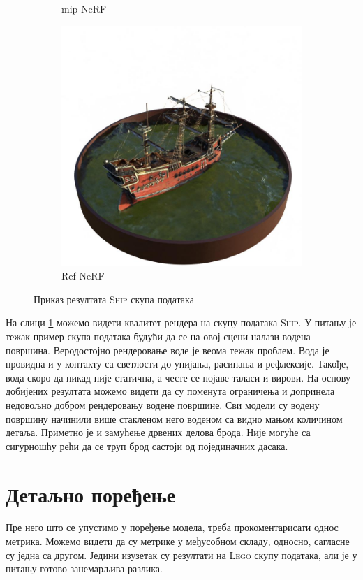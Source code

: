 \documentclass[12pt, a4paper, twoside]{book}
\numberwithin{equation}{chapter}
\numberwithin{theorem}{section}
\numberwithin{definition}{section}
\numberwithin{definitionChapter}{chapter}
\begin{document}
\begin{figure}[H]
\begin{subfigure}{0.475\textwidth}
			\caption{mip-NeRF}
		\end{subfigure}
		\begin{subfigure}{0.475\textwidth}
			\centering
			\includegraphics[scale=0.25]{img/refnerf/refnerf_ship_38.jpg}
			\caption{Ref-NeRF}
		\end{subfigure}
		\caption{Приказ резултата \textsc{Ship} скупа података}
		\label{fig-ship-results}
	\end{figure}

На слици \ref{fig-ship-results} можемо видети квалитет рендера на скупу података \textsc{Ship}.
У питању је тежак пример скупа података будући да се на овој сцени налази водена површина.
Веродостојно рендеровање воде је веома тежак проблем. Вода је провидна и у контакту са светлости
до упијања, расипања и рефлексије. Такође, вода скоро да никад није статична, а честе се појаве
таласи и вирови. На основу добијених резултата можемо видети да су поменута ограничења
и допринела недовољно добром рендеровању водене површине. Сви модели су водену површину начинили више
стакленом него воденом са видно мањом количином детаља. Приметно је и замућење дрвених делова брода.
Није могуће са сигурношћу рећи да се труп брод састоји од појединачних дасака.


\section{Детаљно поређење}
Пре него што се упустимо у поређење модела, треба прокоментарисати однос метрика. Можемо видети да су метрике у 
међусобном складу, односно, сагласне су једна са другом. Једини изузетак су резултати на \textsc{Lego} скупу података,
али је у питању готово занемарљива разлика.
\end{document}
